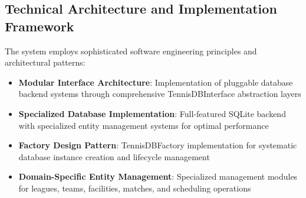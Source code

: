 \subsection{Technical Architecture and Implementation Framework}

The system employs sophisticated software engineering principles and architectural patterns:

\begin{itemize}
    \item \textbf{Modular Interface Architecture}: Implementation of pluggable database backend systems through comprehensive TennisDBInterface abstraction layers
    \item \textbf{Specialized Database Implementation}: Full-featured SQLite backend with specialized entity management systems for optimal performance
    \item \textbf{Factory Design Pattern}: TennisDBFactory implementation for systematic database instance creation and lifecycle management
    \item \textbf{Domain-Specific Entity Management}: Specialized management modules for leagues, teams, facilities, matches, and scheduling operations

\end{itemize}


\pagebreak
